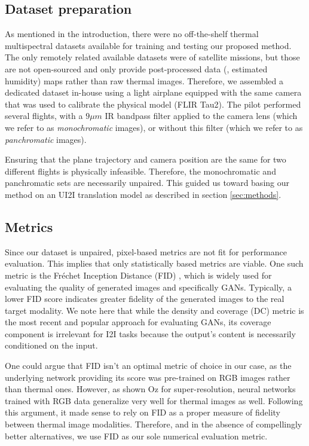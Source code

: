 \subsection{Dataset preparation} \label{sec:dataset}
As mentioned in the introduction, there were no off-the-shelf thermal multispectral datasets available for training and testing our proposed method.
The only remotely related available datasets were of satellite missions, but those are not open-sourced and only provide post-processed data (\eg, estimated humidity) maps rather than raw thermal images.
Therefore, we assembled a dedicated dataset in-house using a light airplane equipped with the same camera that was used to calibrate the physical model (FLIR Tau2).
The pilot performed several flights, with a $9 \mu m$ IR bandpass filter applied to the camera lens (which we refer to as \emph{monochromatic} images), or without this filter (which we refer to as \emph{panchromatic} images).

Ensuring that the plane trajectory and camera position are the same for two different flights is physically infeasible. Therefore, the monochromatic and panchromatic sets are necessarily unpaired.
This guided us toward basing our method on an UI2I translation model as described in section \ref{sec:methods}.

\subsection{Metrics}
Since our dataset is unpaired, pixel-based metrics are not fit for performance evaluation. 
This implies that only statistically based metrics are viable.
One such metric is the Fréchet Inception Distance (FID) \cite{DBLP:journals/corr/HeuselRUNKH17}, which is widely used for evaluating the quality of generated images and specifically GANs.
Typically, a lower FID score indicates greater fidelity of the generated images to the real target modality.
We note here that while the density and coverage (DC) \cite{naeem2020reliable} metric is the most recent and popular approach for evaluating GANs, its coverage component is irrelevant for I2I tasks because the output's content is necessarily conditioned on the input.

One could argue that FID isn't an optimal metric of choice in our case, as the underlying network providing its score was pre-trained on RGB images rather than thermal ones.
However, as shown Oz \etal \cite{Oz:20} for super-resolution, neural networks trained with RGB data generalize very well for thermal images as well.
Following this argument, it made sense to rely on FID as a proper measure of fidelity between thermal image modalities.
Therefore, and in the absence of compellingly better alternatives, we use FID as our sole numerical evaluation metric.


